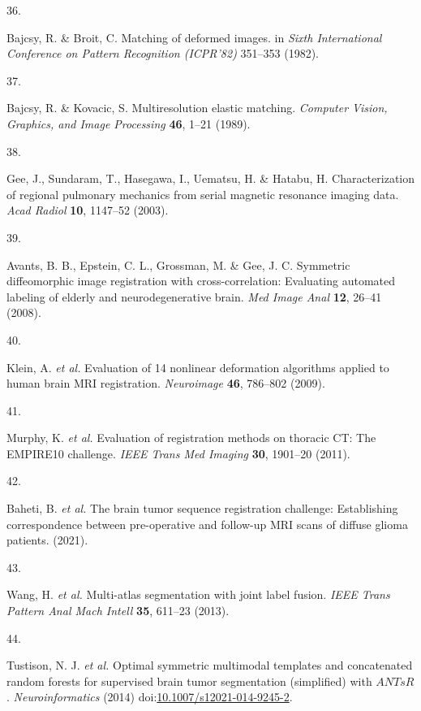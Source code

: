 \documentclass[
  12pt,
]{article}
\newlength{\cslhangindent}
\newlength{\csllabelwidth}
\newenvironment{CSLReferences}[2] %
 {%
  \setlength{\parindent}{0pt}
  \ifodd #1 \everypar{\setlength{\hangindent}{\cslhangindent}}\ignorespaces\fi
  \ifnum #2 > 0
  \setlength{\parskip}{#2\baselineskip}
  \fi
 }%
 {}
\newcommand{\CSLLeftMargin}[1]{\parbox[t]{\csllabelwidth}{#1}}
\newcommand{\CSLRightInline}[1]{\parbox[t]{\linewidth - \csllabelwidth}{#1}\break}
\begin{document}
\begin{CSLReferences}{0}{0}
\leavevmode{}%
\CSLLeftMargin{36. }
\CSLRightInline{Bajcsy, R. \& Broit, C. Matching of deformed images. in
\emph{{S}ixth {I}nternational {C}onference on {P}attern {R}ecognition
({ICPR}'82)} 351--353 (1982).}

\leavevmode{}%
\CSLLeftMargin{37. }
\CSLRightInline{Bajcsy, R. \& Kovacic, S. Multiresolution elastic
matching. \emph{Computer Vision, Graphics, and Image Processing}
\textbf{46}, 1--21 (1989).}

\leavevmode{}%
\CSLLeftMargin{38. }
\CSLRightInline{Gee, J., Sundaram, T., Hasegawa, I., Uematsu, H. \&
Hatabu, H. Characterization of regional pulmonary mechanics from serial
magnetic resonance imaging data. \emph{Acad Radiol} \textbf{10},
1147--52 (2003).}

\leavevmode{}%
\CSLLeftMargin{39. }
\CSLRightInline{Avants, B. B., Epstein, C. L., Grossman, M. \& Gee, J.
C. Symmetric diffeomorphic image registration with cross-correlation:
Evaluating automated labeling of elderly and neurodegenerative brain.
\emph{Med Image Anal} \textbf{12}, 26--41 (2008).}

\leavevmode{}%
\CSLLeftMargin{40. }
\CSLRightInline{Klein, A. \emph{et al.} Evaluation of 14 nonlinear
deformation algorithms applied to human brain {MRI} registration.
\emph{Neuroimage} \textbf{46}, 786--802 (2009).}

\leavevmode{}%
\CSLLeftMargin{41. }
\CSLRightInline{Murphy, K. \emph{et al.} Evaluation of registration
methods on thoracic {CT}: The {EMPIRE10} challenge. \emph{IEEE Trans Med
Imaging} \textbf{30}, 1901--20 (2011).}

\leavevmode{}%
\CSLLeftMargin{42. }
\CSLRightInline{Baheti, B. \emph{et al.} The brain tumor sequence
registration challenge: Establishing correspondence between
pre-operative and follow-up MRI scans of diffuse glioma patients.
(2021).}

\leavevmode{}%
\CSLLeftMargin{43. }
\CSLRightInline{Wang, H. \emph{et al.} Multi-atlas segmentation with
joint label fusion. \emph{IEEE Trans Pattern Anal Mach Intell}
\textbf{35}, 611--23 (2013).}

\leavevmode{}%
\CSLLeftMargin{44. }
\CSLRightInline{Tustison, N. J. \emph{et al.} Optimal symmetric
multimodal templates and concatenated random forests for supervised
brain tumor segmentation (simplified) with {\(ANTsR\)}.
\emph{Neuroinformatics} (2014)
doi:\href{https://doi.org/10.1007/s12021-014-9245-2}{10.1007/s12021-014-9245-2}.}


\end{CSLReferences}
\end{document}
